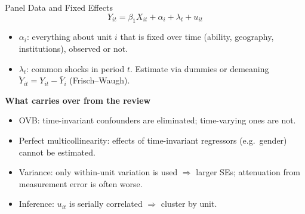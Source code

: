 \documentclass[9pt,aspectratio=169]{beamer}
\begin{document}
\begin{frame}{Panel Data and Fixed Effects}
\linespread{1.2}\selectfont
  \[
    Y_{it}=\beta_1X_{it}+\alpha_i+\lambda_t+u_{it}
  \]
  \begin{itemize}
    \item $\alpha_i$: everything about unit $i$ that is fixed over time (ability, geography, institutions), observed or not.
    \item $\lambda_t$: common shocks in period $t$. Estimate via dummies or demeaning $\ddot Y_{it}=Y_{it}-\bar Y_i$ (Frisch--Waugh).
  \end{itemize}
  \medskip
  \textbf{What carries over from the review}
  \begin{itemize}
    \item OVB: time-invariant confounders are eliminated; time-varying ones are not.
    \item Perfect multicollinearity: effects of time-invariant regressors (e.g.\ gender) cannot be estimated.
    \item Variance: only within-unit variation is used $\Rightarrow$ larger SEs; attenuation from measurement error is often worse.
    \item Inference: $u_{it}$ is serially correlated $\Rightarrow$ cluster by unit.
  \end{itemize}
\end{frame}
\end{document}
